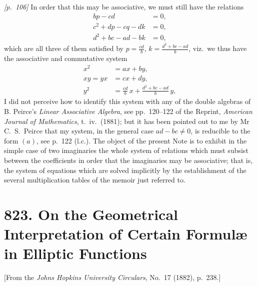 \documentclass[11pt,a4paper]{book}
\begin{document}
\noindent\textit{[p.~106]} In order that this may be associative, we must still have the relations
\begin{align*}
bp - cd &= 0,\\
c^2 + dp - cq - dk &= 0,\\
d^2 + bc - ad - bk &= 0,
\end{align*}
which are all three of them satisfied by $p = \frac{cd}{b}$, $k = \frac{d^2 + bc - ad}{b}$, viz.\ we thus have the associative and commutative system
\begin{align*}
x^2 &= ax + by,\\
xy = yx &= cx + dy,\\
y^2 &= \frac{cd}{b}\,x + \frac{d^2 + bc - ad}{b}\,y,
\end{align*}
I did not perceive how to identify this system with any of the double algebras of B. Peirce's \textit{Linear Associative Algebra}, see pp.~120--122 of the Reprint, \textit{American Journal of Mathematics}, t.~iv.\ (1881); but it has been pointed out to me by Mr C.\ S.\ Peirce that my system, in the general case $ad - bc \neq 0$, is reducible to the form $(a)$, see p.~122 (l.c.). The object of the present Note is to exhibit in the simple case of two imaginaries the whole system of relations which must subsist between the coefficients in order that the imaginaries may be associative; that is, the system of equations which are solved implicitly by the establishment of the several multiplication tables of the memoir just referred to.

\bigskip

\section*{823. On the Geometrical Interpretation of Certain Formul\ae{} in Elliptic Functions}

\begin{center}
\small[From the \textit{Johns Hopkins University Circulars}, No.~17 (1882), p.~238.]
\end{center}

\bigskip
\end{document}
